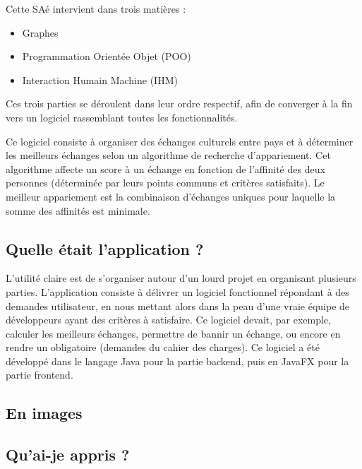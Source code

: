 \documentclass{mytex}
\begin{document}
Cette SAé intervient dans trois matières :

\begin{itemize}
	\item Graphes
	\item Programmation Orientée Objet (POO)
	\item Interaction Humain Machine (IHM)
\end{itemize}

Ces trois parties se déroulent dans leur ordre respectif, afin de converger à la fin vers un logiciel rassemblant toutes les fonctionnalités.

Ce logiciel consiste à organiser des échanges culturels entre pays et à déterminer les meilleurs échanges selon un algorithme de recherche d'appariement. Cet algorithme affecte un score à un échange en fonction de l'affinité des deux personnes (déterminée par leurs points communs et critères satisfaits). Le meilleur appariement est la combinaison d'échanges uniques pour laquelle la somme des affinités est minimale.

\subsection{Quelle était l'application ?}

L'utilité claire est de s'organiser autour d'un lourd projet en organisant plusieurs parties. L'application consiste à délivrer un logiciel fonctionnel répondant à des demandes utilisateur, en nous mettant alors dans la peau d'une vraie équipe de développeurs ayant des critères à satisfaire. Ce logiciel devait, par exemple, calculer les meilleurs échanges, permettre de bannir un échange, ou encore en rendre un obligatoire (demandes du cahier des charges). Ce logiciel a été développé dans le langage Java pour la partie backend, puis en JavaFX pour la partie frontend.

\subsection{En images}




\subsection{Qu'ai-je appris ?}
\end{document}
